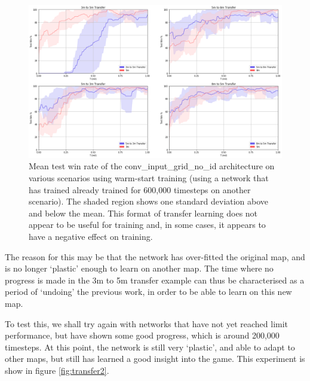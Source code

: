 \begin{figure}[h]
    \centering
    \hbox{\hspace{-5em}\includegraphics[width=1.2\textwidth]{images/graphs/6.png}}
    \caption{Mean test win rate of the conv\_input\_grid\_no\_id architecture on various scenarios using warm-start training (using a network that has trained already trained for 600,000 timesteps on another scenario). The shaded region shows one standard deviation above and below the mean. This format of transfer learning does not appear to be useful for training and, in some cases, it appears to have a negative effect on training. }
    \label{fig:transfer6}
\end{figure}


The reason for this may be that the network has over-fitted the original map, and is no longer `plastic' enough to learn on another map. The time where no progress is made in the 3m to 5m transfer example can thus be characterised as a period of `undoing' the previous work, in order to be able to learn on this new map.

To test this, we shall try again with networks that have not yet reached limit performance, but have shown some good progress, which is around 200,000 timesteps. At this point, the network is still very `plastic', and able to adapt to other maps, but still has learned a good insight into the game. This experiment is show in figure \ref{fig:transfer2}.


